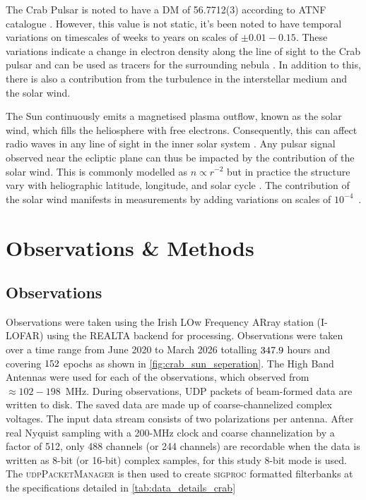 The Crab Pulsar is noted to have a DM of 56.7712(3) \dm according to ATNF catalogue \citep{ATNFCat_2005}. However, this value is not static, it's been noted to have temporal variations on timescales of weeks to years on scales of $\pm0.01-0.15$\dm \citep{lyne_23_1993}. These variations indicate a change in electron density along the line of sight to the Crab pulsar and can be used as tracers for the surrounding nebula \citep{isaacman_crab_1977}. In addition to this, there is also a contribution from the turbulence in the interstellar medium and the solar wind. 


The Sun continuously emits a magnetised plasma outflow, known as the solar wind, which fills the heliosphere with free electrons. Consequently, this can affect radio waves in any line of sight in the inner solar system \citep{tiburzi_impact_2021}. Any pulsar signal observed near the ecliptic plane can thus be impacted by the contribution of the solar wind. This is commonly modelled as $n\propto r^{-2}$ but in practice the structure vary with heliographic latitude, longitude, and solar cycle \citep{susarla_exploring_2024}. The contribution of the solar wind manifests in measurements by adding variations on scales of $10^{-4}$~\dm. 

\section{Observations \& Methods} \label{sec:obsnmethod}

\subsection{Observations} 

Observations were taken using the Irish LOw Frequency ARray station (I-LOFAR) using the REALTA backend \citep{RealTa_paper} for processing. Observations were taken over a time range from June 2020 to March 2026 totalling $347.9$ hours and covering $152$ epochs as shown in \cref{fig:crab_sun_seperation}. The High Band Antennas were used for each of the observations, which observed from $\approx 102-198$~MHz. During observations, UDP packets of beam-formed data are written to disk. The saved data are made up of coarse-channelized complex voltages.  The input data stream consists of two polarizations per antenna. After real Nyquist sampling with a 200-MHz clock and coarse channelization by a factor of 512, only 488 channels (or 244 channels) are recordable when the data is written as 8-bit (or 16-bit) complex samples, for this study 8-bit mode is used. The \textsc{udpPacketManager} \citep{David_JOSS} is then used to create \textsc{sigproc} \citep{lorimer_sigproc_2011} formatted filterbanks at the specifications detailed in \cref{tab:data_details_crab}

